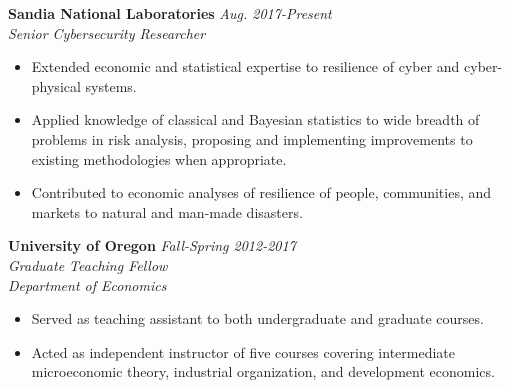 \documentclass[11pt]{article}
\newenvironment{changemargin}[2]{%
  \begin{list}{}{%
    \setlength{\topsep}{0pt}%
    \setlength{\leftmargin}{#1}%
    \setlength{\rightmargin}{#2}%
    \setlength{\listparindent}{\parindent}%
    \setlength{\itemindent}{\parindent}%
    \setlength{\parsep}{\parskip}%
  }%
  \item[]}{\end{list}
}
\newenvironment{body} {
	\vspace*{-16pt}
	\begin{changemargin}{-0.25in}{-0.5in}
  }	
	{\end{changemargin}
}
\begin{document}
\begin{body}
	\vspace{14pt}
	
	\textbf{Sandia National Laboratories} \hfill \emph{Aug. 2017-Present}\\
	\emph{Senior Cybersecurity Researcher}\\
	\vspace*{-4pt}
	\begin{itemize}
		\item Extended economic and statistical expertise to resilience of cyber and cyber-physical systems.
		\item Applied knowledge of classical and Bayesian statistics to wide breadth of problems in risk analysis, proposing and implementing improvements to existing methodologies when appropriate.
		\item Contributed to economic analyses of resilience of people, communities, and markets to natural and man-made disasters.
	\end{itemize}	
	
	
	\textbf{University of Oregon} \hfill \emph{Fall-Spring 2012-2017}\\
	\emph{Graduate Teaching Fellow}\\
	\emph{Department of Economics}
	\vspace*{-4pt}
	\begin{itemize}
		\item Served as teaching assistant to both undergraduate and graduate courses.
		\item Acted as independent instructor of five courses covering intermediate microeconomic theory, industrial organization, and development economics.
	\end{itemize}	
	


\end{body}
\end{document}
